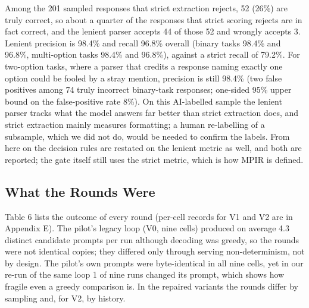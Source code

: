 \documentclass{ieeeaccess}
\begin{document}
Among the 201 sampled responses that strict extraction rejects, 52 (26\%) are truly correct, so about a quarter of the responses that strict scoring rejects are in fact correct, and the lenient parser accepts 44 of those 52 and wrongly accepts 3. Lenient precision is 98.4\% and recall 96.8\% overall (binary tasks 98.4\% and 96.8\%, multi-option tasks 98.4\% and 96.8\%), against a strict recall of 79.2\%. For two-option tasks, where a parser that credits a response naming exactly one option could be fooled by a stray mention, precision is still 98.4\% (two false positives among 74 truly incorrect binary-task responses; one-sided 95\% upper bound on the false-positive rate 8\%). On this AI-labelled sample the lenient parser tracks what the model answers far better than strict extraction does, and strict extraction mainly measures formatting; a human re-labelling of a subsample, which we did not do, would be needed to confirm the labels. From here on the decision rules are restated on the lenient metric as well, and both are reported; the gate itself still uses the strict metric, which is how MPIR is defined.

\subsection{What the Rounds Were}

Table 6 lists the outcome of every round (per-cell records for V1 and V2 are in Appendix E). The pilot's legacy loop (V0, nine cells) produced on average 4.3 distinct candidate prompts per run although decoding was greedy, so the rounds were not identical copies; they differed only through serving non-determinism, not by design. The pilot's own prompts were byte-identical in all nine cells, yet in our re-run of the same loop 1 of nine runs changed its prompt, which shows how fragile even a greedy comparison is. In the repaired variants the rounds differ by sampling and, for V2, by history.
\end{document}
